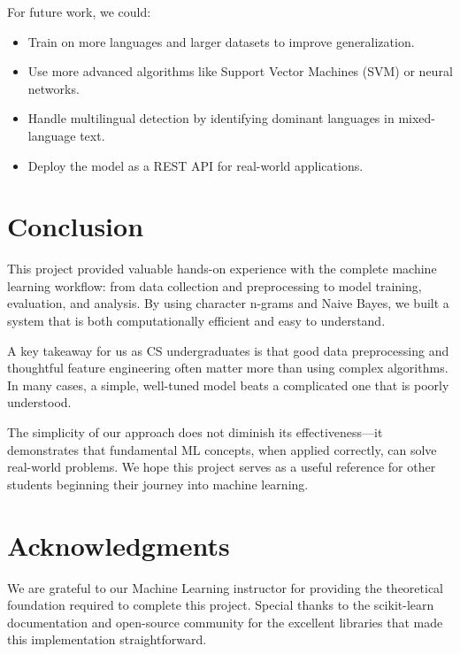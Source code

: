 \documentclass[conference]{IEEEtran}
\begin{document}
For future work, we could:

\begin{itemize}
    \item Train on more languages and larger datasets to improve generalization.
    \item Use more advanced algorithms like Support Vector Machines (SVM) or neural networks.
    \item Handle multilingual detection by identifying dominant languages in mixed-language text.
    \item Deploy the model as a REST API for real-world applications.
\end{itemize}

\section{Conclusion}

This project provided valuable hands-on experience with the complete machine learning workflow: from data collection and preprocessing to model training, evaluation, and analysis. By using character n-grams and Naive Bayes, we built a system that is both computationally efficient and easy to understand. 

A key takeaway for us as CS undergraduates is that good data preprocessing and thoughtful feature engineering often matter more than using complex algorithms. In many cases, a simple, well-tuned model beats a complicated one that is poorly understood.

The simplicity of our approach does not diminish its effectiveness—it demonstrates that fundamental ML concepts, when applied correctly, can solve real-world problems. We hope this project serves as a useful reference for other students beginning their journey into machine learning.

\section*{Acknowledgments}

We are grateful to our Machine Learning instructor for providing the theoretical foundation required to complete this project. Special thanks to the scikit-learn documentation and open-source community for the excellent libraries that made this implementation straightforward.
\end{document}
